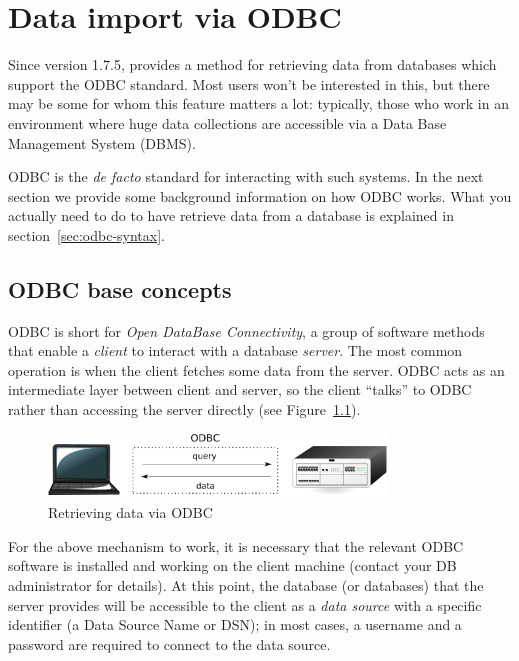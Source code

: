 \chapter{Data import via ODBC}
\label{chap:odbc}

Since version 1.7.5,  provides a method for retrieving data
from databases which support the ODBC standard. Most users
won't be interested in this, but there may be some for whom this
feature matters a lot: typically, those who work in an environment
where huge data collections are accessible via a Data Base Management
System (DBMS).

ODBC is the \emph{de facto} standard for interacting with such
systems. In the next section we provide some background information on
how ODBC works. What you actually need to do to have 
retrieve data from a database is explained in
section~\ref{sec:odbc-syntax}.

\section{ODBC base concepts}
\label{sec:odbc-base}

ODBC is short for \emph{Open DataBase Connectivity}, a group of
software methods that enable a \emph{client} to interact with a
database \emph{server}. The most common operation is when the client
fetches some data from the server. ODBC acts as an intermediate layer
between client and server, so the client ``talks'' to ODBC rather than
accessing the server directly (see Figure~\ref{fig:odbc}).

\begin{figure}[htbp]
  \centering
  \includegraphics[width=0.8\textwidth]{figures/odbc}
  \caption{Retrieving data via ODBC}
  \label{fig:odbc}
\end{figure}

For the above mechanism to work, it is necessary that the relevant
ODBC software is installed and working on the client machine (contact
your DB administrator for details). At this point, the database (or
databases) that the server provides will be accessible to the client
as a \emph{data source} with a specific identifier (a Data Source Name
or DSN); in most cases, a username and a password are required to
connect to the data source.

